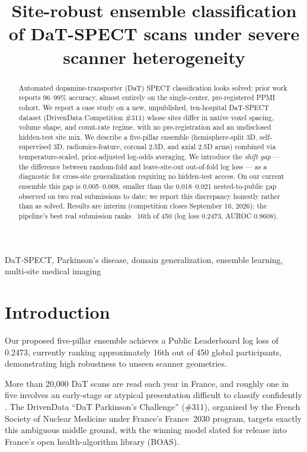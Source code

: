 \documentclass{article}
\title{Site-robust ensemble classification of DaT-SPECT scans under severe scanner heterogeneity}
\begin{document}
\maketitle

\begin{abstract}
Automated dopamine-transporter (DaT) SPECT classification looks solved: prior work reports 96--99\% accuracy, almost entirely on the single-center, pre-registered PPMI cohort. We report a case study on a new, unpublished, ten-hospital DaT-SPECT dataset (DrivenData Competition \#311) whose sites differ in native voxel spacing, volume shape, and count-rate regime, with no pre-registration and an undisclosed hidden-test site mix. We describe a five-pillar ensemble (hemisphere-split 3D, self-supervised 3D, radiomics-feature, coronal 2.5D, and axial 2.5D arms) combined via temperature-scaled, prior-adjusted log-odds averaging. We introduce the \emph{shift gap} --- the difference between random-fold and leave-site-out out-of-fold log loss --- as a diagnostic for cross-site generalization requiring no hidden-test access. On our current ensemble this gap is 0.005--0.008, smaller than the 0.018--0.021 nested-to-public gap observed on two real submissions to date; we report this discrepancy honestly rather than as solved. Results are interim (competition closes September 16, 2026); the pipeline's best real submission ranks ~16th of 450 (log loss 0.2473, AUROC 0.9608).
\end{abstract}

\begin{keywords}
DaT-SPECT, Parkinson's disease, domain generalization, ensemble learning, multi-site medical imaging
\end{keywords}

\section{Introduction}

Our proposed five-pillar ensemble achieves a Public Leaderboard log loss of 0.2473, currently ranking approximately 16th out of 450 global participants, demonstrating high robustness to unseen scanner geometries.
\label{sec:intro}

More than 20{,}000 DaT scans are read each year in France, and roughly one in five involves an early-stage or atypical presentation difficult to classify confidently \cite{isbi_challenge}. The DrivenData ``DaT Parkinson's Challenge'' (\#311), organized by the French Society of Nuclear Medicine under France's France~2030 program, targets exactly this ambiguous middle ground, with the winning model slated for release into France's open health-algorithm library (BOAS).
\end{document}
